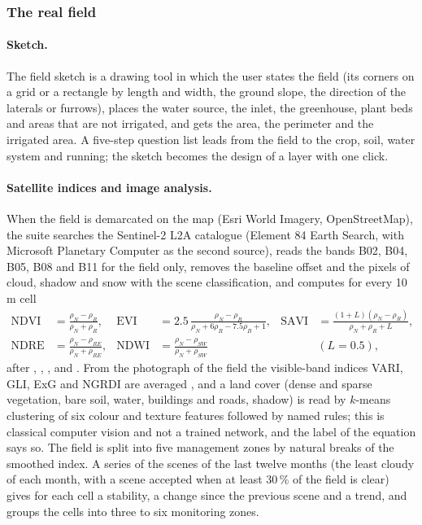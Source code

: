 \documentclass[preprint,12pt]{elsarticle}
\begin{document}
\subsubsection{The real field}
\paragraph{Sketch.}
The field sketch is a drawing tool in which the user states the field (its corners on a grid or a rectangle by length and width, the ground slope, the direction of the laterals or furrows), places the water source, the inlet, the greenhouse, plant beds and areas that are not irrigated, and gets the area, the perimeter and the irrigated area. A five-step question list leads from the field to the crop, soil, water system and running; the sketch becomes the design of a layer with one click.

\paragraph{Satellite indices and image analysis.}
When the field is demarcated on the map (Esri World Imagery, OpenStreetMap), the suite searches the Sentinel-2 L2A catalogue (Element 84 Earth Search, with Microsoft Planetary Computer as the second source), reads the bands B02, B04, B05, B08 and B11 for the field only, removes the baseline offset and the pixels of cloud, shadow and snow with the scene classification, and computes for every 10\,m cell
\begin{equation}\label{eq:idx}
\begin{aligned}
\mathrm{NDVI}&=\frac{\rho_N-\rho_R}{\rho_N+\rho_R}, & \mathrm{EVI}&=2.5\,\frac{\rho_N-\rho_R}{\rho_N+6\rho_R-7.5\rho_B+1}, & \mathrm{SAVI}&=\frac{(1+L)(\rho_N-\rho_R)}{\rho_N+\rho_R+L},\\
\mathrm{NDRE}&=\frac{\rho_N-\rho_{RE}}{\rho_N+\rho_{RE}}, & \mathrm{NDWI}&=\frac{\rho_N-\rho_{SW}}{\rho_N+\rho_{SW}} & &(L=0.5),
\end{aligned}
\end{equation}
after \cite{Rouse1974}, \cite{Huete2002}, \cite{Huete1988}, \cite{Barnes2000} and \cite{Gao1996}. From the photograph of the field the visible-band indices VARI, GLI, ExG and NGRDI are averaged \cite{Gitelson2002,Woebbecke1995}, and a land cover (dense and sparse vegetation, bare soil, water, buildings and roads, shadow) is read by $k$-means clustering of six colour and texture features followed by named rules; this is classical computer vision and not a trained network, and the label of the equation says so. The field is split into five management zones by natural breaks of the smoothed index. A series of the scenes of the last twelve months (the least cloudy of each month, with a scene accepted when at least 30\,\% of the field is clear) gives for each cell a stability, a change since the previous scene and a trend, and groups the cells into three to six monitoring zones.
\end{document}

